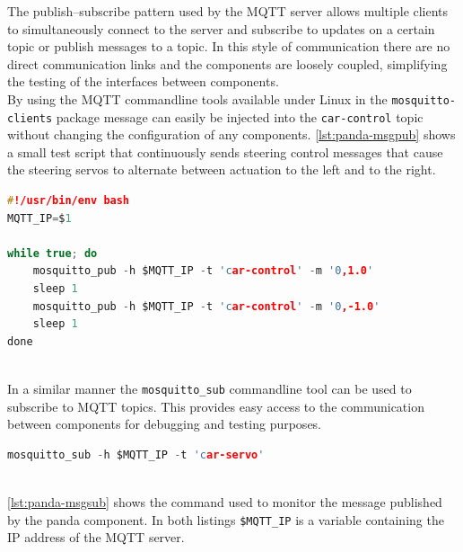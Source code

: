The publish–subscribe pattern used by the MQTT server allows multiple clients to simultaneously connect to the server and subscribe to updates on a certain topic or publish messages to a topic.
In this style of communication there are no direct communication links and the components are loosely coupled, simplifying the testing of the interfaces between components. \\

By using the MQTT commandline tools available under Linux in the \texttt{mosquitto-clients} package message can easily be injected into the \texttt{car-control} topic without changing the configuration of any components.
\autoref{lst:panda-msgpub} shows a small test script that continuously sends steering control messages that cause the steering servos to alternate between actuation to the left and to the right. \\ %

\begin{minipage}{\linewidth}
\begin{lstlisting}[style=mylistings, language=c, label=lst:panda-msgpub, caption=Injecting steering commands over MQTT]
#!/usr/bin/env bash
MQTT_IP=$1

while true; do
	mosquitto_pub -h $MQTT_IP -t 'car-control' -m '0,1.0'
	sleep 1
	mosquitto_pub -h $MQTT_IP -t 'car-control' -m '0,-1.0'
	sleep 1
done
\end{lstlisting}
\end{minipage} \\

In a similar manner the \texttt{mosquitto\_sub} commandline tool can be used to subscribe to MQTT topics. This provides easy access to the communication between components for debugging and testing purposes. \\

\begin{minipage}{\linewidth}
\begin{lstlisting}[style=mylistings, language=c, label=lst:panda-msgsub, caption=Subscribing to MQTT topics]
mosquitto_sub -h $MQTT_IP -t 'car-servo'
\end{lstlisting}
\end{minipage} \\

\autoref{lst:panda-msgsub} shows the command used to monitor the message published by the panda component. In both listings \texttt{\$MQTT\_IP} is a variable containing the IP address of the MQTT server. \\
